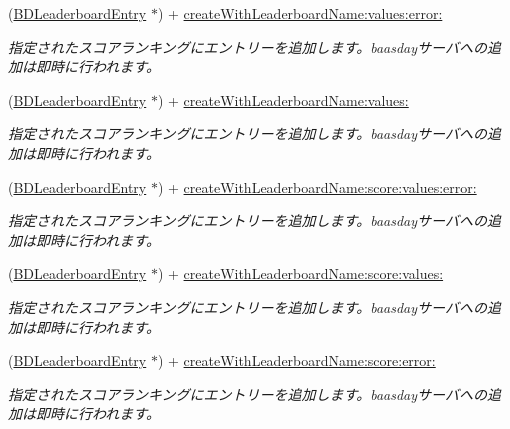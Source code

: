 \begin{DoxyCompactItemize}
\item 
(\hyperlink{interface_b_d_leaderboard_entry}{B\-D\-Leaderboard\-Entry} $\ast$) + \hyperlink{interface_b_d_leaderboard_entry_a372d15b5056d9bcc6c1f09a81aa21888}{create\-With\-Leaderboard\-Name\-:values\-:error\-:}
\begin{DoxyCompactList}\small\item\em 指定されたスコアランキングにエントリーを追加します。baasdayサーバへの追加は即時に行われます。 \end{DoxyCompactList}\item 
(\hyperlink{interface_b_d_leaderboard_entry}{B\-D\-Leaderboard\-Entry} $\ast$) + \hyperlink{interface_b_d_leaderboard_entry_add5af3941f1078d9590c564fd521b7c8}{create\-With\-Leaderboard\-Name\-:values\-:}
\begin{DoxyCompactList}\small\item\em 指定されたスコアランキングにエントリーを追加します。baasdayサーバへの追加は即時に行われます。 \end{DoxyCompactList}\item 
(\hyperlink{interface_b_d_leaderboard_entry}{B\-D\-Leaderboard\-Entry} $\ast$) + \hyperlink{interface_b_d_leaderboard_entry_a32ea7323b71574456bc3376e889e71de}{create\-With\-Leaderboard\-Name\-:score\-:values\-:error\-:}
\begin{DoxyCompactList}\small\item\em 指定されたスコアランキングにエントリーを追加します。baasdayサーバへの追加は即時に行われます。 \end{DoxyCompactList}\item 
(\hyperlink{interface_b_d_leaderboard_entry}{B\-D\-Leaderboard\-Entry} $\ast$) + \hyperlink{interface_b_d_leaderboard_entry_af4b08cef580f429770c3a2d66f4e9f2c}{create\-With\-Leaderboard\-Name\-:score\-:values\-:}
\begin{DoxyCompactList}\small\item\em 指定されたスコアランキングにエントリーを追加します。baasdayサーバへの追加は即時に行われます。 \end{DoxyCompactList}\item 
(\hyperlink{interface_b_d_leaderboard_entry}{B\-D\-Leaderboard\-Entry} $\ast$) + \hyperlink{interface_b_d_leaderboard_entry_ae4ed62e8894b66ce7ef13c55f1331dd4}{create\-With\-Leaderboard\-Name\-:score\-:error\-:}
\begin{DoxyCompactList}\small\item\em 指定されたスコアランキングにエントリーを追加します。baasdayサーバへの追加は即時に行われます。 \end{DoxyCompactList}\item 

\end{DoxyCompactItemize}
